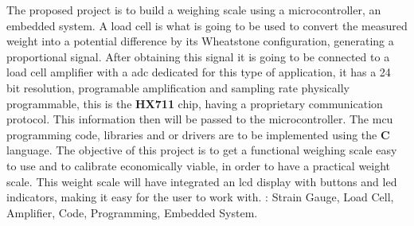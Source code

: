 \begin{secondlangabstract}
\par The proposed project is to build a weighing scale using a microcontroller, an embedded system.
\emptyline
A load cell is what is going to be used to convert the measured weight into a potential difference by its Wheatstone configuration, generating a proportional signal.
\emptyline
After obtaining this signal it is going to be connected to a load cell amplifier with a \ac{adc} dedicated for this type of application, it has a 24 bit resolution, programable amplification and sampling rate physically programmable, this is the \textbf{HX711} chip, having a proprietary communication protocol.
This information then will be passed to the microcontroller.
\emptyline
The \ac{mcu} programming code, libraries and or drivers are to be implemented using the \textbf{C} language. The objective of this project is to get a functional weighing scale easy to use and to calibrate economically viable, in order to have a practical weight scale.
\emptyline
This weight scale will have integrated an \acs{lcd} display with buttons and \acs{led} indicators, making it easy for the user to work with.
\hfill \vfill
\noindent
\textbf{\keywordslabel}: Strain Gauge, Load Cell, Amplifier, Code, Programming, Embedded System.
\end{secondlangabstract}
